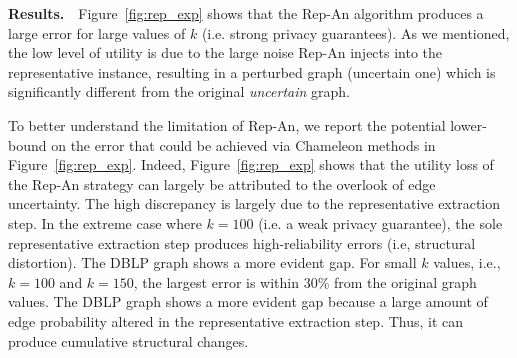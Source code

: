 \textbf{Results.}~~Figure~\ref{fig:rep_exp} shows that the Rep-An algorithm produces a large error for large values of $k$ (i.e. strong privacy guarantees). As we mentioned, the low level of utility is due to the large noise Rep-An injects into the representative instance, resulting in a perturbed graph (uncertain one) which is significantly different from the original \emph{uncertain} graph. 

To better understand the limitation of Rep-An, we report the potential lower-bound on the error that could be achieved via Chameleon methods in Figure~\ref{fig:rep_exp}. Indeed, Figure~\ref{fig:rep_exp} shows that the utility loss of the Rep-An strategy can largely be attributed to the overlook of edge uncertainty. 
The high discrepancy is largely due to the representative extraction step. In the extreme case where $k=100$ (i.e. a weak privacy guarantee), the sole representative extraction step produces high-reliability errors (i.e, structural distortion). 
The \textsc{DBLP} graph shows a more evident gap. For small $k$ values, i.e., $k=100$ and $k=150$, the largest error is within 30\% from the original graph values. The \textsc{DBLP} graph shows a more evident gap because a large amount of edge probability altered in the representative extraction step. Thus, it can produce cumulative structural changes. 
  




